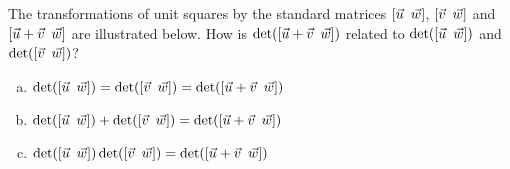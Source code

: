 \begin{applicationActivities}{1}{25}
\begin{activity}{5}
The transformations of unit squares by the
standard matrices \([\vec{u}\hspace{0.5em} \vec{w}]\), \([\vec{v}\hspace{0.5em} \vec{w}]\) and
\([\vec{u}+\vec{v}\hspace{0.5em} \vec{w}]\) are illustrated below.
How is $\det([\vec{u}+\vec{v}\hspace{0.5em} \vec{w}])$ related to
$\det([\vec{u}\hspace{0.5em} \vec{w}])$ and $\det([\vec{v}\hspace{0.5em} \vec{w}])$?
\begin{center}
\end{center}
  \begin{enumerate}[a)]
    \item
    $\det([\vec{u}\hspace{0.5em} \vec{w}])=\det([\vec{v}\hspace{0.5em} \vec{w}])=\det([\vec{u}+\vec{v}\hspace{0.5em} \vec{w}])$
    \item
    $\det([\vec{u}\hspace{0.5em} \vec{w}])+\det([\vec{v}\hspace{0.5em} \vec{w}])=\det([\vec{u}+\vec{v}\hspace{0.5em} \vec{w}])$
    \item
    $\det([\vec{u}\hspace{0.5em} \vec{w}])\det([\vec{v}\hspace{0.5em} \vec{w}])=\det([\vec{u}+\vec{v}\hspace{0.5em} \vec{w}])$
  \end{enumerate}
\end{activity}



\end{applicationActivities}
